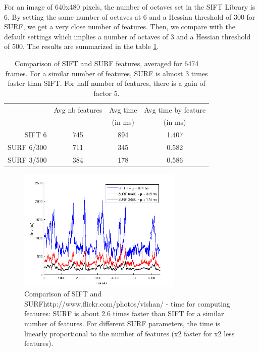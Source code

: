 For an image of 640x480 pixels, the number of octaves set in the SIFT Library is 6. By setting the same number of octaves at 6 and a Hessian threshold of 300 for \gls{SURF}, we get a very close number of features. Then, we compare with the default settings which implies a number of octaves of 3 and a Hessian threshold of 500. The results are summarized in the table \ref{tab:stats_features}.

\begin{table}[h]
 \begin{center}
 \begin{tabular}{r|ccc}
 & Avg nb features & Avg time & Avg time by feature \\
 &  & (in ms) & (in ms) \\
 \hline
 SIFT 6 & 745 & 894 & 1.407\\
 SURF 6/300 & 711  & 345  & 0.582 \\
 SURF 3/500 & 384 & 178 & 0.586 \\
 \end{tabular}
\caption{Comparison of SIFT and SURF features, averaged for 6474 frames. For a similar number of features, SURF is almost 3 times faster than SIFT. For half number of features, there is a gain of factor 5.}
\label{tab:stats_features}
\end{center}
\end{table}

\clearpage

\begin{figure}[H]
\begin{center}
\includegraphics[width=0.7\textwidth]{figures/stats_features_time}
\caption{Comparison of SIFT and SURFhttp://www.flickr.com/photos/vishan/ - time for computing features: SURF is about 2.6 times faster than SIFT for a similar number of features. For different SURF parameters, the time is linearly proportional to the number of features (x2 faster for x2 less features).}
\end{center}
\end{figure}

